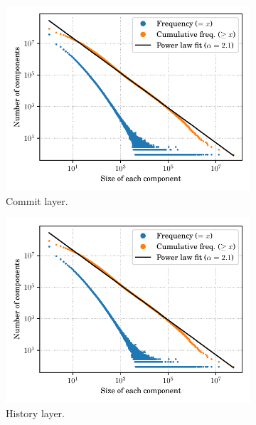\begin{figure}
    \begin{subfigure}{.49\textwidth}
        \includegraphics[width=\linewidth]{img/topology/connectedcomponents/rev}
        \caption{Commit layer.}
        \label{fig:connectedcomponents_rev}
    \end{subfigure}\hfill
    \begin{subfigure}{.49\textwidth}
        \includegraphics[width=\linewidth]{img/topology/connectedcomponents/rel+rev}
        \caption{History layer.}
        \label{fig:connectedcomponents_rel+rev}
    \end{subfigure}
    \newline
    \begin{subfigure}{.49\textwidth}

\end{subfigure}
\end{figure}
